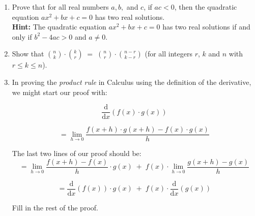 \begin{enumerate}
\wbvfill

\item Prove that for all real numbers $a,b,$ and $c$, if $ac<0$, then the quadratic
equation $ax^{2}+bx+c=0$ has two real solutions.\\
\textbf{Hint:} The quadratic equation $ax^{2}+bx+c=0$ has two
real solutions if and only if $b^{2}-4ac>0$ and $a\neq0$.


\wbvfill

\workbookpagebreak

\item Show that $\binom{n}{k} \cdot \binom{k}{r} \; = \; \binom{n}{r} \cdot \binom{n-r}{k-r}$ (for all integers $r$, $k$ and $n$ with $r \leq k \leq n$). 


\wbvfill

\workbookpagebreak

\item In proving the  \emph{product rule} in Calculus using the definition of the derivative, we might start our proof with:

\[
\frac{\mbox{d}}{\mbox{d}x} \left( f(x) \cdot g(x) \right)
\]

\[ = \lim_{h \longrightarrow 0} \frac{f(x+h) \cdot g(x+h) - f(x) \cdot g(x)}{h} \]

\noindent The last two lines of our proof should be:
\[
= \lim_{h \longrightarrow 0} \frac{f(x+h) - f(x)}{h} \cdot g(x) \; + \; f(x) \cdot \lim_{h \longrightarrow 0} \frac{g(x+h) - g(x)}{h}
\]

\[
= \frac{\mbox{d}}{\mbox{d}x}\left( f(x) \right) \cdot g(x) \; + \; f(x) \cdot \frac{\mbox{d}}{\mbox{d}x}\left( g(x) \right) 
\]

Fill in the rest of the proof.


\wbvfill

\workbookpagebreak

\end{enumerate}
